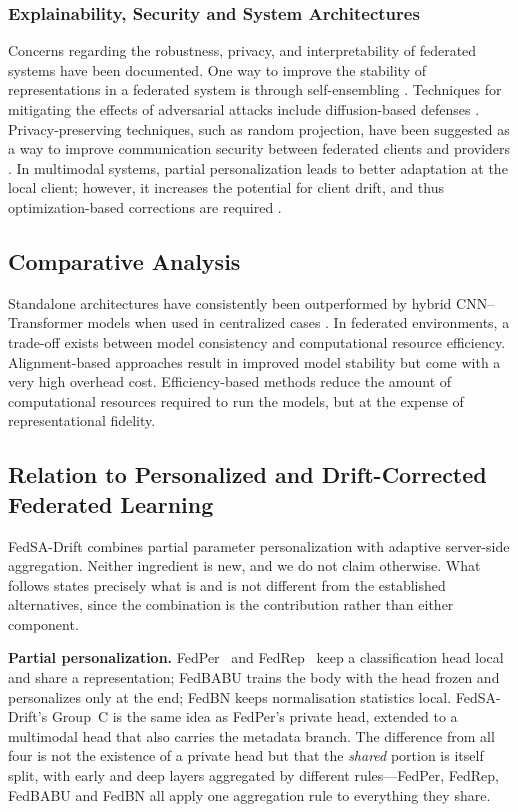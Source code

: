 \documentclass[utf8]{FrontiersinHarvard} %
\newcommand{\sadrift}{FedSA-Drift}
\begin{document}
\subsubsection{Explainability, Security and System Architectures}
Concerns regarding the robustness, privacy, and interpretability of federated systems have been documented. One way to improve the stability of representations in a federated system is through self-ensembling \citep{Almalik2022}. Techniques for mitigating the effects of adversarial attacks include diffusion-based defenses \citep{Imam2023}. Privacy-preserving techniques, such as random projection, have been suggested as a way to improve communication security between federated clients and providers \citep{Narimani2024}. In multimodal systems, partial personalization leads to better adaptation at the local client; however, it increases the potential for client drift, and thus optimization-based corrections are required \citep{Zhu2025}.
\subsection{Comparative Analysis}
Standalone architectures have consistently been outperformed by hybrid CNN–Transformer models when used in centralized cases \citep{Naeem2025,Alshdaifat2025}. In federated environments, a trade-off exists between model consistency and computational resource efficiency. Alignment-based approaches result in improved model stability but come with a very high overhead cost. Efficiency-based methods reduce the amount of computational resources required to run the models, but at the expense of representational fidelity.
\subsection{Relation to Personalized and Drift-Corrected Federated Learning}
\label{sec:positioning}

\sadrift{} combines partial parameter personalization with adaptive server-side aggregation. Neither ingredient is new, and we do not claim otherwise. What follows states precisely what is and is not different from the established alternatives, since the combination is the contribution rather than either component.

\textbf{Partial personalization.} FedPer~\citep{Collins2021} and FedRep~\citep{Collins2021} keep a classification head local and share a representation; FedBABU trains the body with the head frozen and personalizes only at the end; FedBN keeps normalisation statistics local. \sadrift{}'s Group~C is the same idea as FedPer's private head, extended to a multimodal head that also carries the metadata branch. The difference from all four is not the existence of a private head but that the \emph{shared} portion is itself split, with early and deep layers aggregated by different rules---FedPer, FedRep, FedBABU and FedBN all apply one aggregation rule to everything they share.
\end{document}
